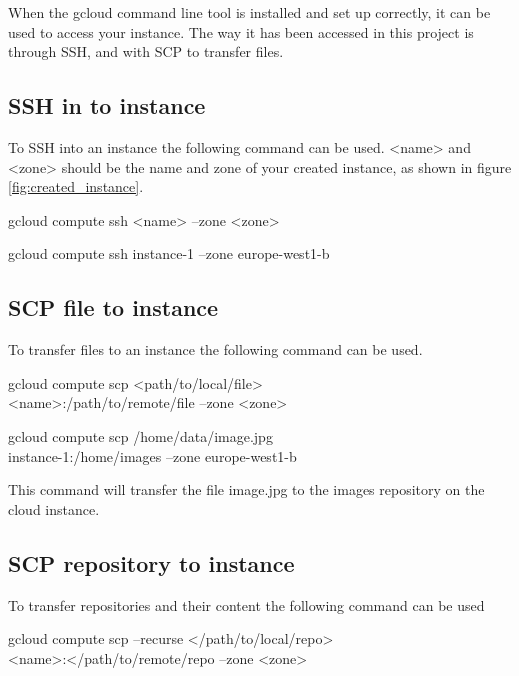 When the gcloud command line tool is installed and set up correctly, it can be used to access your instance. The way it has been accessed in this project is through SSH, and with SCP to transfer files. 

\vspace{3mm}
\subsection{SSH in to instance}
To SSH into an instance the following command can be used. <name> and <zone> should be the name and zone of your created instance, as shown in figure \ref{fig:created_instance}.

\begin{lcverbatim}
    gcloud compute ssh <name> --zone <zone>
\end{lcverbatim}
\begin{lcverbatim}
    gcloud compute ssh instance-1 --zone europe-west1-b
\end{lcverbatim}

\subsection{SCP file to instance}
To transfer files to an instance the following command can be used. 
\begin{lcverbatim}
gcloud compute scp <path/to/local/file> \\ 
<name>:/path/to/remote/file --zone <zone>
\end{lcverbatim}
\begin{lcverbatim}
gcloud compute scp /home/data/image.jpg  \\
instance-1:/home/images --zone europe-west1-b
\end{lcverbatim}

This command will transfer the file image.jpg to the images repository on the cloud instance.

\subsection{SCP repository to instance}

\vspace{3mm}
To transfer repositories and their content the following command can be used

\begin{lcverbatim}
gcloud compute scp --recurse </path/to/local/repo> \\ 
<name>:</path/to/remote/repo --zone <zone>
\end{lcverbatim}

